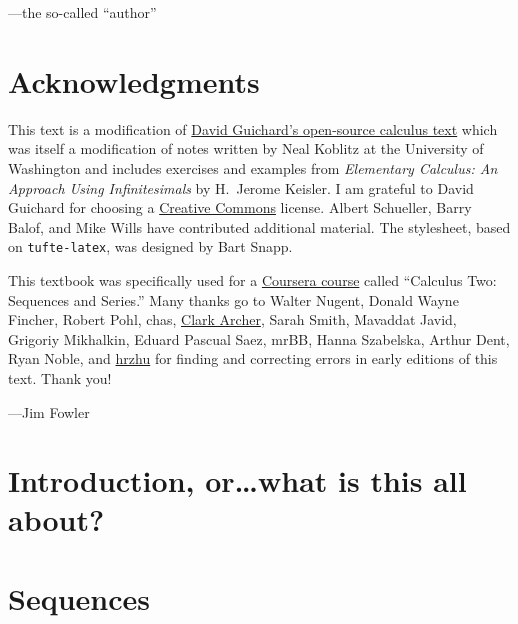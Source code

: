 \documentclass[justified]{tufte-book}
\begin{document}
\vspace{0.5in}
\hfill---the so-called ``author''

\chapter*{Acknowledgments}

This text is a modification of
\href{http://www.whitman.edu/mathematics/calculus/}{David Guichard's
  open-source calculus text} which was itself a modification of notes
written by Neal Koblitz at the University of Washington and includes
exercises and examples from {\it Elementary Calculus: An Approach
  Using Infinitesimals} by H.~Jerome Keisler.  I am grateful to David
Guichard for choosing a
\href{http://creativecommons.org/licenses/by-nc-sa/3.0/}{Creative
  Commons} license.  Albert Schueller, Barry Balof, and Mike Wills
have contributed additional material.  The stylesheet, based on \texttt{tufte-latex}, was designed by Bart Snapp.

This textbook was specifically used for a
\href{https://www.coursera.org/course/sequence}{Coursera course}
called ``Calculus Two: Sequences and Series.''  Many thanks go to
Walter Nugent, Donald Wayne Fincher, Robert Pohl, chas,
\href{https://github.com/clark-archer}{Clark Archer}, Sarah Smith,
Mavaddat Javid, Grigoriy Mikhalkin, Eduard Pascual Saez, mrBB, Hanna
Szabelska, Arthur Dent, Ryan Noble, and
\href{https://github.com/hrzhu}{hrzhu} for finding and correcting
errors in early editions of this text.  Thank you!

\vspace{0.5in}
\hfill---Jim Fowler

\mainmatter

\chapter*{Introduction, or\ldots what is this all about?}



\chapter{Sequences}
\label{chapter:sequences}

\end{document}
